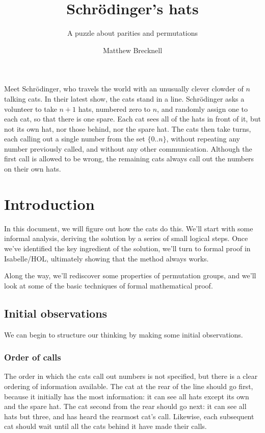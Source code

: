 \documentclass[10pt,a4paper]{scrartcl}
\begin{document}
\title{Schr\"odinger's hats}
\subtitle{A puzzle about parities and permutations}
\author{Matthew Brecknell}

\maketitle

Meet Schr\"odinger, who travels the world with an unusually clever clowder of
$n$ talking cats. In their latest show, the cats stand in a line.
Schr\"odinger asks a volunteer to take $n+1$ hats, numbered zero to $n$, and
randomly assign one to each cat, so that there is one spare. Each cat sees all
of the hats in front of it, but not its own hat, nor those behind, nor the
spare hat. The cats then take turns, each calling out a single number from the
set $\{0..n\}$, without repeating any number previously called, and without any
other communication. Although the first call is allowed to be wrong, the
remaining cats always call out the numbers on their own hats.

\section{Introduction}

In this document, we will figure out how the cats do this. We'll start with
some informal analysis, deriving the solution by a series of small logical
steps. Once we've identified the key ingredient of the solution, we'll turn to
formal proof in Isabelle/HOL, ultimately showing that the method always works.

Along the way, we'll rediscover some properties of permutation groups, and
we'll look at some of the basic techniques of formal mathematical proof.

\subsection{Initial observations}

We can begin to structure our thinking by making some initial observations.

\subsubsection{Order of calls}

The order in which the cats call out numbers is not specified, but there is a
clear ordering of information available. The cat at the rear of the line should
go first, because it initially has the most information: it can see all hats
except its own and the spare hat. The cat second from the rear should go next:
it can see all hats but three, and has heard the rearmost cat's call. Likewise,
each subsequent cat should wait until all the cats behind it have made their
calls.
\end{document}
